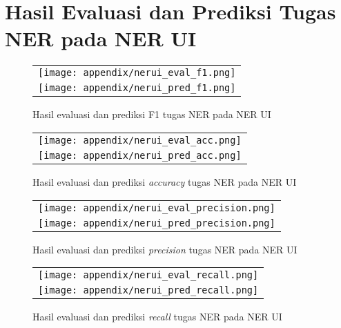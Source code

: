 \chapter{Hasil Evaluasi dan Prediksi Tugas NER pada NER UI}
\label{appendix:nerui}

\begin{figure}[h]
    \centering
    \begin{longtable}{c}
        \texttt{[image: appendix/nerui\_eval\_f1.png]} \\
        \texttt{[image: appendix/nerui\_pred\_f1.png]} \\
    \end{longtable}
    \caption{Hasil evaluasi dan prediksi F1 tugas NER pada NER UI}
\end{figure}

\begin{figure}[h]
    \centering
    \begin{longtable}{c}
        \texttt{[image: appendix/nerui\_eval\_acc.png]} \\
        \texttt{[image: appendix/nerui\_pred\_acc.png]} \\
    \end{longtable}
    \caption{Hasil evaluasi dan prediksi \textit{accuracy} tugas NER pada NER UI}
\end{figure}

\begin{figure}[h]
    \centering
    \begin{longtable}{c}
        \texttt{[image: appendix/nerui\_eval\_precision.png]} \\
        \texttt{[image: appendix/nerui\_pred\_precision.png]} \\
    \end{longtable}
    \caption{Hasil evaluasi dan prediksi \textit{precision} tugas NER pada NER UI}
\end{figure}

\begin{figure}[h]
    \centering
    \begin{longtable}{c}
        \texttt{[image: appendix/nerui\_eval\_recall.png]} \\
        \texttt{[image: appendix/nerui\_pred\_recall.png]} \\
    \end{longtable}
    \caption{Hasil evaluasi dan prediksi \textit{recall} tugas NER pada NER UI}
\end{figure}

